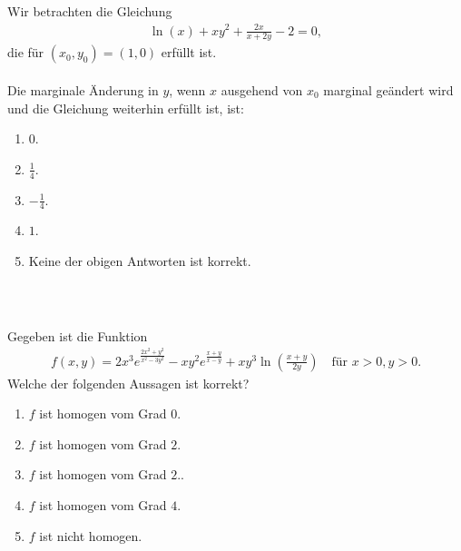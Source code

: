 \subsection*{}
Wir betrachten die Gleichung
\begin{align*}
	\ln(x) + x y^2 + \frac{2x}{x + 2y} - 2 = 0,
\end{align*}
die für $(x_0,y_0) = (1,0)$ erfüllt ist.\\
\\
Die marginale Änderung in $y$, wenn $x$ ausgehend von $x_0$ marginal geändert wird und die Gleichung weiterhin erfüllt ist, ist:
\renewcommand{\labelenumi}{(\alph{enumi})}
\begin{enumerate}
	\item 
	$ 0 $.
	\item
	$ \frac{1}{4}$.
	\item
	$ -\frac{1}{4}$.
	\item
	$ 1$.
	\item
	Keine der obigen Antworten ist korrekt.
\end{enumerate}
\ \\
\subsection*{}
Gegeben ist die Funktion
\begin{align*}
	f(x,y) 
	=
	2 x^3 e^{\frac{ 2x^2+y^2}{x^2 - 3y^2 }}
	-
	xy^2 e^{\frac{x+y}{x-y}}
	+
	x y^3 \ln \left( \frac{x+y }{2y} \right)
	\quad \textrm{für } x>0,y>0.
\end{align*}
Welche der folgenden Aussagen ist korrekt?
\renewcommand{\labelenumi}{(\alph{enumi})}
\begin{enumerate}
	\item
	$ f  $ ist homogen vom Grad $ 0 $.
	\item
	$ f  $ ist homogen vom Grad $ 2 $.
	\item
	$ f  $ ist homogen vom Grad $ 2 $..	
	\item 
	$ f  $ ist homogen vom Grad $ 4 $.
	\item
	$ f $ ist nicht homogen.
\end{enumerate}
\ \\
